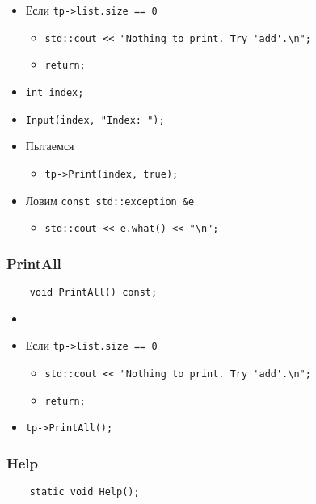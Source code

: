 \begin{itemize}
	\item Если \verb|tp->list.size == 0|
		\begin{itemize}
			\item \verb|std::cout << "Nothing to print. Try 'add'.\n";|
			\item \verb|return;|
		\end{itemize}
    \item \verb|int index;|
    \item \verb|Input(index, "Index: ");|
	\item Пытаемся
		\begin{itemize}
			\item \verb|tp->Print(index, true);|
		\end{itemize}
	\item Ловим \verb|const std::exception &e|
		\begin{itemize}
			\item \verb|std::cout << e.what() << "\n";|
		\end{itemize}
\end{itemize}


\subsubsection*{PrintAll}

\begin{lstlisting}
	void PrintAll() const;
\end{lstlisting}

\begin{itemize}
	\item \verb||
	\item Если \verb|tp->list.size == 0|
		\begin{itemize}
			\item \verb|std::cout << "Nothing to print. Try 'add'.\n";|
			\item \verb|return;|
		\end{itemize}
    \item \verb|tp->PrintAll();|
\end{itemize}


\subsubsection*{Help}

\begin{lstlisting}
	static void Help();
\end{lstlisting}

